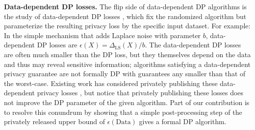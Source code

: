 








\textbf{Data-dependent DP losses.} The flip side of data-dependent DP algorithms is the study of data-dependent DP losses \citep{papernot2018scalable,soria2017individual,wang2017per}, which fix the randomized algorithm but parameterize the resulting privacy loss by the specific input dataset. For example: In the simple mechanism that adds Laplace noise with parameter $b$, data-dependent DP losses are $\epsilon(X) = \Delta_{\text{LS}}(X)/b$. The data-dependent DP losses are often much smaller than the DP loss, but they themselves depend on the data and thus may reveal sensitive information; algorithms satisfying a data-dependent privacy guarantee are not formally DP with guarantees any smaller than that of the worst-case. Existing work has considered privately publishing these data-dependent privacy losses \citep{papernot2018scalable,redberg2021privately}, but notice that privately publishing these losses does not improve the DP parameter of the given algorithm. Part of our contribution is to resolve this conundrum by showing that a simple post-processing step of the privately released upper bound of $\epsilon(\text{Data})$ gives a formal DP algorithm.

